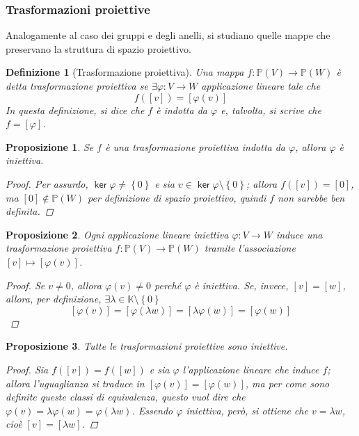 \documentclass[11pt, a4paper]{scrartcl}
\theoremstyle{style1}
\newtheorem{prop}{Proposizione}[section]
\newtheorem{definizione}{Definizione}[section]
\numberwithin{equation}{subsection}
\renewcommand{\operatorname}[1]{\mathop{\mathrm{\textsf{#1}}}}
\begin{document}
\subsubsection{Trasformazioni proiettive}
Analogamente al caso dei gruppi e degli anelli, si studiano quelle mappe che preservano la struttura di spazio proiettivo.
\begin{definizione}
	[Trasformazione proiettiva]
	Una mappa $f : \mathbb{P}(V)\to \mathbb{P}(W)$ \`e detta \textit{trasformazione proiettiva} se $\exists \varphi : V \to W$ applicazione lineare tale che
	\[
		f([v]) = [\varphi (v)]
	\] 
	In questa definizione, si dice che $f$ \`e \textit{indotta} da $\varphi $ e, talvolta, si scrive che $f = [\varphi ]$.
\end{definizione}
\begin{prop}
	Se $f$ \`e una trasformazione proiettiva indotta da $\varphi $, allora $\varphi $ \`e iniettiva.
	\begin{proof}
		Per assurdo, $\operatorname{ker} \varphi  \neq \left\{ 0 \right\} $ e sia $v \in \operatorname{ker} \varphi \setminus \left\{ 0 \right\} $; allora $f([v]) = [0]$, ma $[0] \not \in \mathbb{P}(W)$ per definizione di spazio proiettivo, quindi $f$ non sarebbe ben definita.
	\end{proof}
\end{prop}
\begin{prop}
	Ogni applicazione lineare iniettiva $\varphi :V\to W$ induce una trasformazione proiettiva $f: \mathbb{P}(V) \to \mathbb{P}(W)$ tramite l'associazione $[v] \mapsto [\varphi (v)]$.
	\begin{proof}
		Se $v\neq 0$, allora $\varphi (v) \neq 0$ perch\'e $\varphi $ \`e iniettiva. 
		Se, invece, $[v] = [w]$, allora, per definizione, $\exists \lambda  \in \mathbb{K}\setminus \left\{ 0 \right\}$
		\[
			[\varphi (v) ] = [\varphi (\lambda w)] = [\lambda \varphi (w)] = [\varphi (w)]
		\] 
		
	\end{proof}
\end{prop}
\begin{prop}
	Tutte le trasformazioni proiettive sono iniettive.
	\begin{proof}
		Sia $f([v]) = f([w])$ e sia $\varphi $ l'applicazione lineare che induce $f$; allora l'uguaglianza si traduce in $[\varphi (v)]=[\varphi (w)]$, ma per come sono definite queste classi di equivalenza, questo vuol dire che $\varphi (v) = \lambda \varphi (w) = \varphi (\lambda w)$.
		Essendo $\varphi $ iniettiva, per\`o, si ottiene che $v = \lambda w$, cio\`e $[v] = [\lambda w]$.
	\end{proof}
\end{prop}
\end{document}
